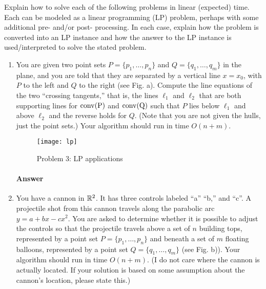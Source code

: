 \documentclass{article}
\begin{document}

\collab{\todo{}}

Explain how to solve each of the following problems in linear (expected) time.
Each can be modeled as a linear programming (LP) problem, perhaps with some
additional pre- and/or post- processing. In each case, explain how the problem
is converted into an LP instance and how the answer to the LP instance is
used/interpreted to solve the stated problem.

\begin{enumerate}

    \item You are given two point sets $P = \{p_1,\ldots,p_n\}$ and $Q =
        \{q_1,\ldots,q_m\}$ in the plane, and you are told that they are
        separated by a vertical line $x = x_0$, with $P$ to the left and $Q$ to
        the right (see Fig. a). Compute the line equations of the two
        ``crossing tangents,'' that is, the lines $\ell_1$ and $\ell_2$ that are
        both supporting lines for $\rm{conv}(P)$ and $\rm{conv}(Q)$ such that
        $P$ lies below $\ell_1$ and above $\ell_2$ and the reverse holds for
        $Q$. (Note that you are not given the hulls, just the point sets.) Your
        algorithm should run in time $O(n + m)$.

        \begin{figure}[h]
            \centering
            \texttt{[image: lp]}
            \caption{Problem 3: LP applications}
        \end{figure}

        \paragraph{Answer}

    \item You have a cannon in ${\mathbb R}^2$. It has three controls labeled ``a'' ``b,''
        and ``c''. A projectile shot from this cannon travels along the
        parabolic arc $y = a + bx - cx^2$. You are asked to determine whether it
        is possible to adjust the controls so that the projectile travels above
        a set of $n$ building tops, represented by a point set $P = \{p_1,
        \ldots , p_n\}$ and beneath a set of $m$ floating balloons, represented
        by a point set $Q = \{q_1, \ldots , q_m\}$ (see Fig. b)). Your algorithm
        should run in time $O(n + m)$. (I do not care where the cannon is
        actually located. If your solution is based on some assumption about the
        cannon's location, please state this.)


\end{enumerate}
\end{document}
